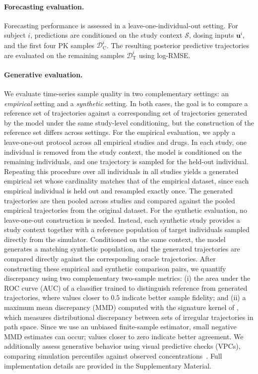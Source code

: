 \paragraph{Forecasting evaluation.}
Forecasting performance is assessed in a leave-one-individual-out setting.
%
For subject $i$, predictions are conditioned on the study context $\mathcal{S}$, dosing inputs $\mathbf{u}^i$, and the first four PK samples $\mathcal{D}^i_{\mathrm{C}}$.
%
The resulting posterior predictive trajectories are evaluated on the remaining samples $\mathcal{D}^i_{\mathrm{T}}$ using log-RMSE.

\paragraph{Generative evaluation.}
We evaluate time-series sample quality in two complementary settings: an \emph{empirical} setting and a \emph{synthetic} setting.
%
In both cases, the goal is to compare a reference set of trajectories against a corresponding set of trajectories generated by the model under the same study-level conditioning, but the construction of the reference set differs across settings.
%
For the empirical evaluation, we apply a leave-one-out protocol across all empirical studies and drugs.
%
In each study, one individual is removed from the study context, the model is conditioned on the remaining individuals, and one trajectory is sampled for the held-out individual.
%
Repeating this procedure over all individuals in all studies yields a generated empirical set whose cardinality matches that of the empirical dataset, since each empirical individual is held out and resampled exactly once.
%
The generated trajectories are then pooled across studies and compared against the pooled empirical trajectories from the original dataset.
%
For the synthetic evaluation, no leave-one-out construction is needed.
%
Instead, each synthetic study provides a study context together with a reference population of target individuals sampled directly from the simulator.
%
Conditioned on the same context, the model generates a matching synthetic population, and the generated trajectories are compared directly against the corresponding oracle trajectories.
%
After constructing these empirical and synthetic comparison pairs, we quantify discrepancy using two complementary two-sample metrics: (i) the area under the ROC curve (AUC) of a classifier trained to distinguish reference from generated trajectories, where values closer to $0.5$ indicate better sample fidelity; and (ii) a maximum mean discrepancy (MMD) computed with the signature kernel of \citet{kiraly2019kernels}, which measures distributional discrepancy between sets of irregular trajectories in path space. Since we use an unbiased finite-sample estimator, small negative MMD estimates can occur; values closer to zero indicate better agreement.
%
We additionally assess generative behavior using visual predictive checks (VPCs), comparing simulation percentiles against observed concentrations~\citep{holford2005}. Full implementation details are provided in the Supplementary Material.

